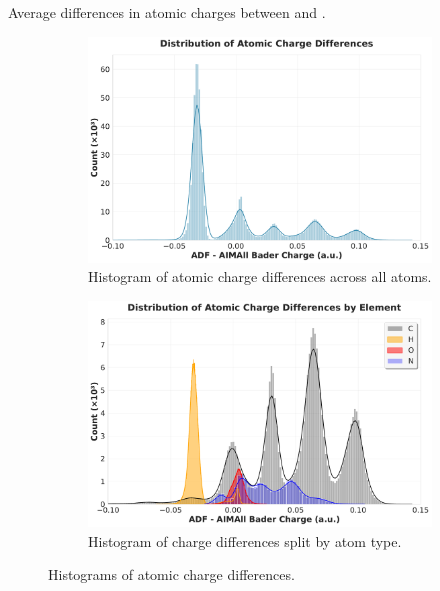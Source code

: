 \begin{table}[h!]
  \caption{Average differences in atomic charges between \adf and \aimall.}
  
  \label{tab_charge_diff}
\end{table}

\begin{figure}[h]
  \centering
  \begin{subfigure}[b]{0.48\textwidth}
    \centering
    \includegraphics[width=\textwidth]{img/histogram_q_total}
    \caption{Histogram of atomic charge differences across all atoms.}
    \label{histogram_charge}
  \end{subfigure}
  \hfill%
  \begin{subfigure}[b]{0.48\textwidth}
    \centering
    \includegraphics[width=\textwidth]{img/histogram_q_split}
    \caption{Histogram of charge differences split by atom type.}
    \label{atom_histo_charge}
  \end{subfigure}
  \caption{Histograms of atomic charge differences.}
\end{figure}
  
